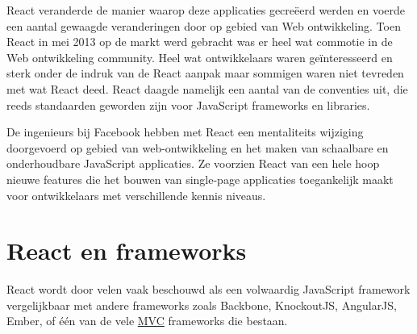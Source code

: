 	React veranderde de manier waarop deze applicaties gecreëerd werden en voerde een aantal gewaagde veranderingen door op gebied van Web ontwikkeling. Toen React in mei 2013 op de markt werd gebracht was er heel wat commotie in de Web ontwikkeling community. Heel wat ontwikkelaars waren geïnteresseerd en sterk onder de indruk van de React aanpak maar sommigen waren niet tevreden met wat React deed. React daagde namelijk een aantal van de conventies uit, die reeds standaarden geworden zijn voor JavaScript frameworks en libraries.
	
	De ingenieurs bij Facebook hebben met React een mentaliteits wijziging doorgevoerd op gebied van web-ontwikkeling en het maken van schaalbare en onderhoudbare JavaScript applicaties. Ze voorzien React van een hele hoop nieuwe features die het bouwen van single-page applicaties toegankelijk maakt voor ontwikkelaars met verschillende kennis niveaus. \citep{gackenheimer:react}
	
\section{React en frameworks}
	
	React wordt door velen vaak beschouwd als een volwaardig JavaScript framework vergelijkbaar met andere frameworks zoals Backbone, KnockoutJS, AngularJS, Ember, of één van de vele \hyperref[mvc]{MVC} frameworks die bestaan.
	
